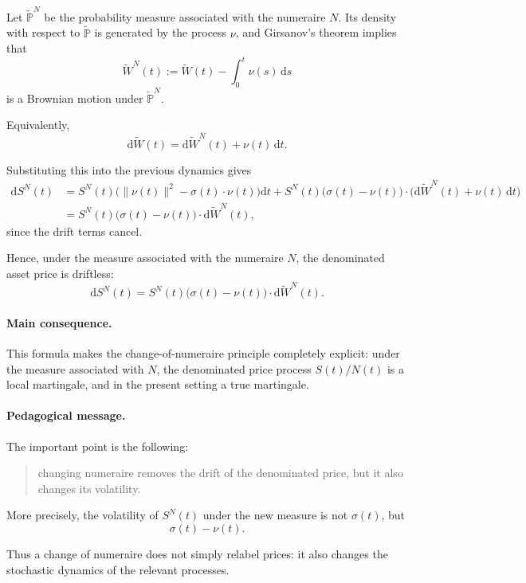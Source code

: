 \documentclass[11pt]{article}
\theoremstyle{definition}
\theoremstyle{plain}
\begin{document}
Let \(\widetilde{\mathbb P}^N\) be the probability measure associated
with the numeraire \(N\).
Its density with respect to \(\widetilde{\mathbb P}\) is generated by
the process \(\nu\), and Girsanov's theorem implies that
\[
\widetilde W^N(t)
:=
\widetilde W(t)-\int_0^t \nu(s)\,\mathrm{d}s
\]
is a Brownian motion under \(\widetilde{\mathbb P}^N\).

Equivalently,
\[
\mathrm{d}\widetilde W(t)
=
\mathrm{d}\widetilde W^N(t)+\nu(t)\,\mathrm{d}t.
\]

Substituting this into the previous dynamics gives
\begin{align*}
\mathrm{d}S^N(t)
&=
S^N(t)
\Big(
\|\nu(t)\|^2-\sigma(t)\cdot\nu(t)
\Big)\mathrm{d}t
+
S^N(t)\big(\sigma(t)-\nu(t)\big)\cdot
\big(\mathrm{d}\widetilde W^N(t)+\nu(t)\,\mathrm{d}t\big)
\\
&=
S^N(t)\big(\sigma(t)-\nu(t)\big)\cdot \mathrm{d}\widetilde W^N(t),
\end{align*}
since the drift terms cancel.

Hence, under the measure associated with the numeraire \(N\), the
denominated asset price is driftless:
\[
\boxed{
\mathrm{d}S^N(t)
=
S^N(t)\big(\sigma(t)-\nu(t)\big)\cdot \mathrm{d}\widetilde W^N(t).
}
\]

\paragraph{Main consequence.}

This formula makes the change-of-numeraire principle completely explicit:
under the measure associated with \(N\), the denominated price process
\(S(t)/N(t)\) is a local martingale, and in the present setting a true
martingale.

\paragraph{Pedagogical message.}

The important point is the following:
\begin{quote}
changing numeraire removes the drift of the denominated price, but it
also changes its volatility.
\end{quote}

More precisely, the volatility of \(S^N(t)\) under the new measure is
not \(\sigma(t)\), but
\[
\sigma(t)-\nu(t).
\]

Thus a change of numeraire does not simply relabel prices:
it also changes the stochastic dynamics of the relevant processes.
\end{document}
